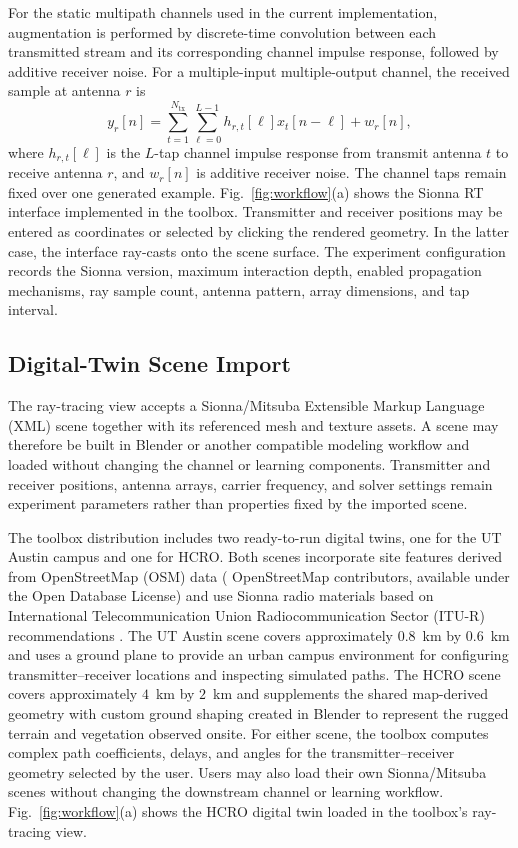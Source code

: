 \documentclass[10pt,conference,letterpaper]{IEEEtran}
\begin{document}
For the static multipath channels used in the current implementation,
augmentation is performed by discrete-time convolution between each transmitted
stream and its corresponding channel impulse response, followed by additive
receiver noise. For a multiple-input multiple-output channel, the received
sample at antenna $r$ is
\begin{equation}
y_r[n] =
\sum_{t=1}^{N_{\mathrm{tx}}}
\sum_{\ell=0}^{L-1}
h_{r,t}[\ell]x_t[n-\ell] + w_r[n],
\label{eq:mimo-channel}
\end{equation}
where $h_{r,t}[\ell]$ is the $L$-tap channel impulse response from transmit
antenna $t$ to receive antenna $r$, and $w_r[n]$ is additive receiver noise.
The channel taps remain fixed over one generated example.
Fig.~\ref{fig:workflow}(a) shows the Sionna RT interface implemented in the toolbox. Transmitter and receiver positions may be entered as coordinates or selected by clicking the rendered geometry. In the latter case, the interface ray-casts onto the scene surface. The experiment configuration records the Sionna version, maximum interaction depth, enabled propagation mechanisms, ray sample count, antenna pattern, array dimensions, and tap interval.


\subsection{Digital-Twin Scene Import}
\label{sec:scenes}

The ray-tracing view accepts a Sionna/Mitsuba Extensible Markup Language (XML) scene together with its referenced mesh and texture assets. A scene may therefore be built in Blender or another compatible modeling workflow and loaded without changing the channel or learning components. Transmitter and receiver positions, antenna arrays, carrier frequency, and solver settings remain experiment parameters rather than properties fixed by the imported scene.

The toolbox distribution includes two ready-to-run digital twins, one for the UT Austin campus and one for HCRO. Both scenes incorporate site features derived from OpenStreetMap (OSM) data
(\textcopyright{} OpenStreetMap contributors, available under the Open Database
License) \cite{osm} and use Sionna radio materials based on International
Telecommunication Union Radiocommunication Sector (ITU-R) recommendations
\cite{itup2040}. The UT Austin scene covers approximately $0.8$~km by $0.6$~km and uses a ground plane to provide an urban campus environment for configuring transmitter--receiver locations and inspecting simulated paths. The HCRO scene covers approximately $4$~km by $2$~km and supplements the shared map-derived geometry with custom ground shaping created in Blender to represent the rugged terrain and vegetation observed onsite. For either scene, the toolbox computes complex path coefficients, delays, and angles for the transmitter--receiver geometry selected by the user. Users may also load their own Sionna/Mitsuba scenes without changing the downstream channel or learning workflow. Fig.~\ref{fig:workflow}(a) shows the HCRO digital twin loaded in the toolbox's ray-tracing view.
\end{document}
